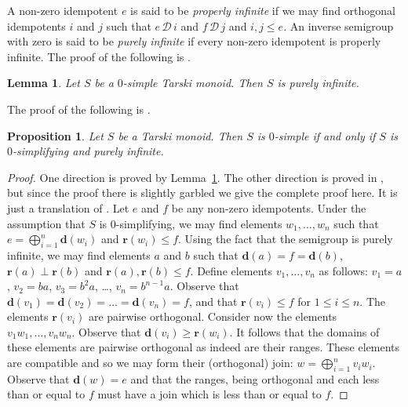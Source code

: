 \documentclass[a4paper]{amsart}
\newtheorem{lemma}[theorem]{Lemma}
\newtheorem{proposition}[theorem]{Proposition}
\begin{document}
A non-zero idempotent $e$ is said to be {\em properly infinite} if we may find orthogonal idempotents
$i$ and $j$ such that $e \, \mathscr{D} \, i$ and $f \, \mathscr{D} \, j$ and $i,j \leq e$.
An inverse semigroup with zero is said to be {\em purely infinite} if every non-zero idempotent
is properly infinite.
The proof of the following is \cite[Lemma 4.11]{Lawson2016}.

\begin{lemma}\label{lem:Tarski-zero-simple} Let $S$ be a $0$-simple Tarski monoid.
Then $S$ is purely infinite.
\end{lemma}

The proof of the following is \cite[Theorem 4.16]{Lawson2016}.

\begin{proposition} Let $S$ be a Tarski monoid.
Then $S$ is $0$-simple if and only if $S$ is $0$-simplifying and purely infinite.
\end{proposition}
\begin{proof} One direction is proved by Lemma~\ref{lem:Tarski-zero-simple}.
The other direction is proved in \cite{Lawson2016},
but since the proof there is slightly garbled we give the complete proof here.
It is just a translation of \cite[Proposition~4.11]{Matui13}.
Let $e$ and $f$ be any non-zero idempotents.
Under the assumption that $S$ is $0$-simplifying, 
we may find elements $w_{1}, \ldots, w_{n}$ such that
$e = \bigoplus_{i=1}^{n} \mathbf{d}(w_{i})$ and $\mathbf{r}(w_{i}) \leq f$.
Using the fact that the semigroup is purely infinite,
we may find elements $a$ and $b$ such that $\mathbf{d}(a) = f = \mathbf{d}(b)$,
$\mathbf{r}(a) \perp \mathbf{r}(b)$ and $\mathbf{r}(a), \mathbf{r}(b) \leq f$.
Define elements $v_{1}, \ldots, v_{n}$ as follows:
$v_{1} = a$, $v_{2} = ba$, $v_{3} = b^{2}a$, \ldots, $v_{n} = b^{n-1}a$.
Observe that $\mathbf{d}(v_{1}) = \mathbf{d}(v_{2}) = \ldots = \mathbf{d}(v_{n}) = f$,
and that $\mathbf{r}(v_{i}) \leq f$ for $1 \leq i \leq n$.
The elements $\mathbf{r}(v_{i})$ are pairwise orthogonal.
Consider now the elements $v_{1}w_{1}, \ldots, v_{n}w_{n}$.
Observe that $\mathbf{d}(v_{i}) \geq \mathbf{r}(w_{i})$.
It follows that the domains of these elements are pairwise orthogonal as indeed are their ranges.
These elements are compatible and so we may form their (orthogonal) join:
$w = \bigoplus_{i=1}^{n} v_{i}w_{i}$.
Observe that $\mathbf{d}(w) = e$ and that the ranges, being orthogonal and each less than or equal to $f$ must have a join which is less than or equal to $f$.
\end{proof}
\end{document}
